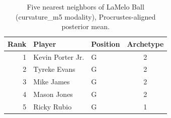 \begin{table}[htbp]
  \centering\small
  \begin{tabular}{rllc}
    \toprule
    Rank & Player & Position & Archetype \\
    \midrule
    1 & Kevin Porter Jr. & G & 2 \\
    2 & Tyreke Evans & G & 2 \\
    3 & Mike James & G & 2 \\
    4 & Mason Jones & G & 2 \\
    5 & Ricky Rubio & G & 1 \\
    \bottomrule
  \end{tabular}
  \caption{Five nearest neighbors of LaMelo Ball (curvature_m5 modality), Procrustes-aligned posterior mean.}
  \label{tab:LaMelo_Ball_neighbors_curvature_m5}
\end{table}

